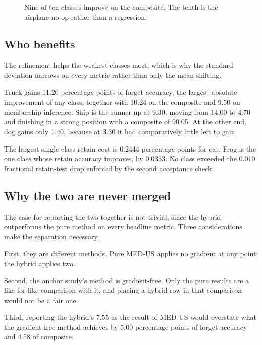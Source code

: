 \begin{figure}[htbp]
  \centering
  \caption{Nine of ten classes improve on the composite. The tenth is the airplane
  no-op rather than a regression.}
  \label{fig:pvh-composite}
\end{figure}

\subsection{Who benefits}

The refinement helps the weakest classes most, which is why the standard deviation
narrows on every metric rather than only the mean shifting.

Truck gains 11.20 percentage points of forget accuracy, the largest absolute
improvement of any class, together with 10.24 on the composite and 9.50 on
membership inference. Ship is the runner-up at 9.30, moving from 14.00 to 4.70 and
finishing in a strong position with a composite of 90.05. At the other end, dog
gains only 1.40, because at 3.30 it had comparatively little left to gain.

The largest single-class retain cost is 0.2444 percentage points for cat. Frog is
the one class whose retain accuracy improves, by 0.0333. No class exceeded the
0.010 fractional retain-test drop enforced by the second acceptance check.

\subsection{Why the two are never merged}

The case for reporting the two together is not trivial, since the hybrid
outperforms the pure method on every headline metric. Three considerations make
the separation necessary.

First, they are different methods. Pure MED-US applies no gradient at any point;
the hybrid applies two.

Second, the anchor study's method is gradient-free. Only the pure results are a
like-for-like comparison with it, and placing a hybrid row in that comparison
would not be a fair one.

Third, reporting the hybrid's 7.55 as the result of MED-US would overstate what
the gradient-free method achieves by 5.00 percentage points of forget accuracy and
4.58 of composite.

